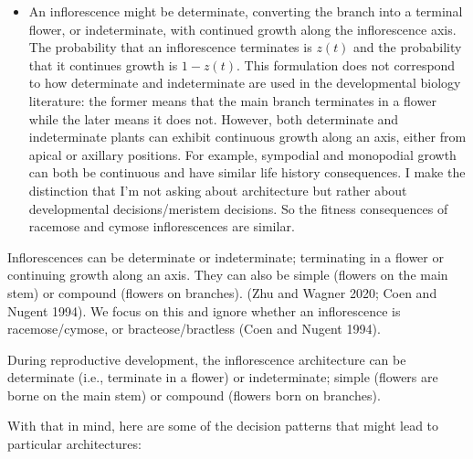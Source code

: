 \documentclass[12pt, oneside]{article}   	%
\begin{document}
\begin{itemize}
    \item An inflorescence might be determinate, converting the branch into a terminal flower, or indeterminate, with continued growth along the inflorescence axis. The probability that an inflorescence terminates is $z(t)$ and the probability that it continues growth is $1-z(t)$. This formulation does not correspond to how determinate and indeterminate are used in the developmental biology literature: the former means that the main branch terminates in a flower while the later means it does not. However, both determinate and indeterminate plants can exhibit continuous growth along an axis, either from apical or axillary positions. For example, sympodial and monopodial growth can both be continuous and have similar life history consequences. I make the distinction that I'm not asking about architecture but rather about developmental decisions/meristem decisions. So the fitness consequences of racemose and cymose inflorescences are similar. 
\end{itemize}

Inflorescences can be determinate or indeterminate; terminating in a flower or continuing growth along an axis. They can also be simple (flowers on the main stem) or compound (flowers on branches). (Zhu and Wagner 2020; Coen and Nugent 1994). We focus on this and ignore whether an inflorescence is racemose/cymose, or bracteose/bractless (Coen and Nugent 1994).

During reproductive development, the inflorescence architecture can be determinate (i.e., terminate in a flower) or indeterminate; simple (flowers are borne on the main stem) or compound (flowers born on branches).

With that in mind, here are some of the decision patterns that might lead to particular architectures:
\end{document}
